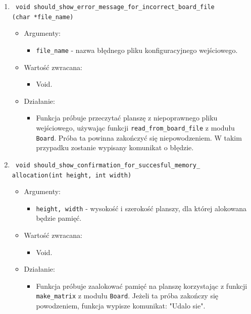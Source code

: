 \documentclass[a4paper,11pt, notitlepage ]{article}
\begin{document}
\begin{enumerate}
\item \verb+ void should_show_error_message_for_incorrect_board_file+ \\\verb+(char *file_name)+
\begin{itemize}
\item Argumenty:
\begin{itemize}
\item \verb+file_name+ - nazwa błędnego pliku konfiguracyjnego wejściowego.
\end{itemize}
\item Wartość zwracana:
\begin{itemize}
\item Void.
\end{itemize}
\item Działanie:
\begin{itemize}
\item Funkcja próbuje przeczytać planszę z niepoprawnego pliku wejściowego, używając funkcji \verb+read_from_board_file+ z modułu \verb+Board+. Próba ta powinna zakończyć się niepowodzeniem. W takim przypadku zostanie wypisany komunikat o błędzie.
\end{itemize}
\end{itemize}


\item \verb+ void should_show_confirmation_for_succesful_memory_+\\\verb+allocation(int height, int width)+
\begin{itemize}
\item Argumenty:
\begin{itemize}
\item \verb+height, width+ - wysokość i szerokość planszy, dla której alokowana będzie pamięć.
\end{itemize}
\item Wartość zwracana:
\begin{itemize}
\item Void.
\end{itemize}
\item Działanie:
\begin{itemize}
\item Funkcja próbuje zaalokować pamięć na planszę korzystając z funkcji \verb+make_matrix+ z modułu \verb+Board+. Jeżeli ta próba zakończy się powodzeniem, funkcja wypisze komunikat: "Udalo sie".
\end{itemize}
\end{itemize}


\end{enumerate}
\end{document}
